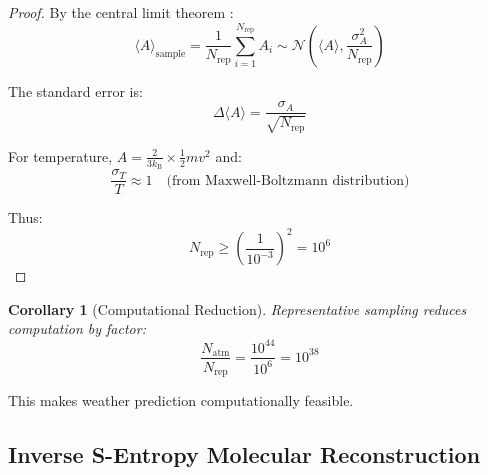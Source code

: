 \documentclass[twocolumn,10pt,a4paper]{article}
\newtheorem{corollary}[theorem]{Corollary}
\theoremstyle{definition}
\theoremstyle{remark}
\newcommand{\kB}{k_{\mathrm{B}}}
\begin{document}
\begin{proof}
By the central limit theorem \cite{billingsley1995probability}:
\begin{equation}
    \langle A \rangle_{\text{sample}} = \frac{1}{N_{\text{rep}}} \sum_{i=1}^{N_{\text{rep}}} A_i \sim \mathcal{N}\left(\langle A \rangle, \frac{\sigma^2_A}{N_{\text{rep}}}\right)
\end{equation}

The standard error is:
\begin{equation}
    \Delta\langle A \rangle = \frac{\sigma_A}{\sqrt{N_{\text{rep}}}}
\end{equation}

For temperature, $A = \frac{2}{3\kB} \times \frac{1}{2}mv^2$ and:
\begin{equation}
    \frac{\sigma_T}{T} \approx 1 \quad \text{(from Maxwell-Boltzmann distribution)}
\end{equation}

Thus:
\begin{equation}
    N_{\text{rep}} \geq \left(\frac{1}{10^{-3}}\right)^2 = 10^6
\end{equation}
\end{proof}

\begin{corollary}[Computational Reduction]
\label{cor:reduction}
Representative sampling reduces computation by factor:
\begin{equation}
    \frac{N_{\text{atm}}}{N_{\text{rep}}} = \frac{10^{44}}{10^6} = 10^{38}
\end{equation}
\end{corollary}

This makes weather prediction computationally feasible.

\subsection{Inverse S-Entropy Molecular Reconstruction}
\end{document}
